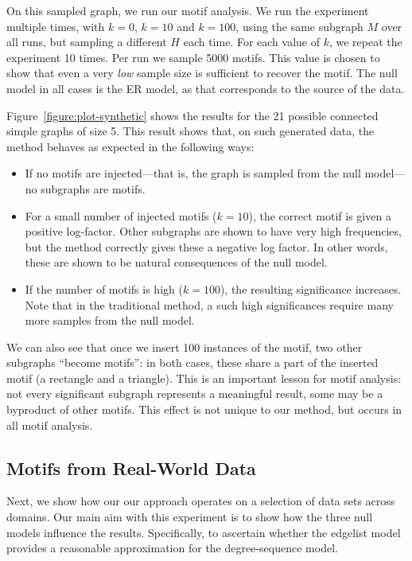 \documentclass[twoside,11pt]{article}
\begin{document}
On this sampled graph, we run our motif analysis. We run the experiment multiple times, with $k = 0$, $k = 10$ and $k = 100$, using the same subgraph $M$ over all runs, but sampling a different $H$ each time. For each value of $k$, we repeat the experiment 10 times. Per run we sample 5000 motifs. This value is chosen to show that even a very \emph{low} sample size is sufficient to recover the motif. The null model in all cases is the ER model, as that corresponds to the source of the data.

Figure~\ref{figure:plot-synthetic} shows the results for the 21 possible connected simple graphs of size 5. This result shows that, on such generated data, the method behaves as expected in the following ways:
\begin{itemize}
	\item If no motifs are injected---that is, the graph is sampled from the null model---no subgraphs are motifs.
	\item For a small number of injected motifs ($k = 10$), the correct motif is given a positive log-factor. Other subgraphs are shown to have very high frequencies, but the method correctly gives these a negative log factor. In other words, these are shown to be natural consequences of the null model.
	\item If the number of motifs is high ($k = 100$), the resulting significance increases. Note that in the traditional method, a such high significances require many more samples from the null model.
\end{itemize}

We can also see that once we insert 100 instances of the motif, two other subgraphs ``become motifs'': in both cases, these share a part of the inserted motif (a rectangle and a triangle). This is an important lesson for motif analysis: not every significant subgraph represents a meaningful result, some may be a byproduct of other motifs. This effect is not unique to our method, but occurs in all motif analysis.

\subsection{Motifs from Real-World Data}
\label{section:various}

Next, we show how our our approach operates on a selection of data sets across domains. Our main aim with this experiment is to show how the three null models influence the results. Specifically, to ascertain whether the edgelist model provides a reasonable approximation for the degree-sequence model.
\end{document}
